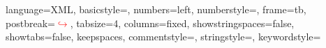  {
	language=XML,		%
	basicstyle=\footnotesize\ttfamily,
	numbers=left,
	numberstyle=\tiny{},
	frame=tb,
	postbreak=\mbox{\textcolor{red}{$\hookrightarrow$}\space},
	tabsize=4,
	columns=fixed,
	showstringspaces=false,
	showtabs=false,
	keepspaces,
	commentstyle=\color{red},
	stringstyle=\color{gray},		%
	keywordstyle=\color{blue}
}













